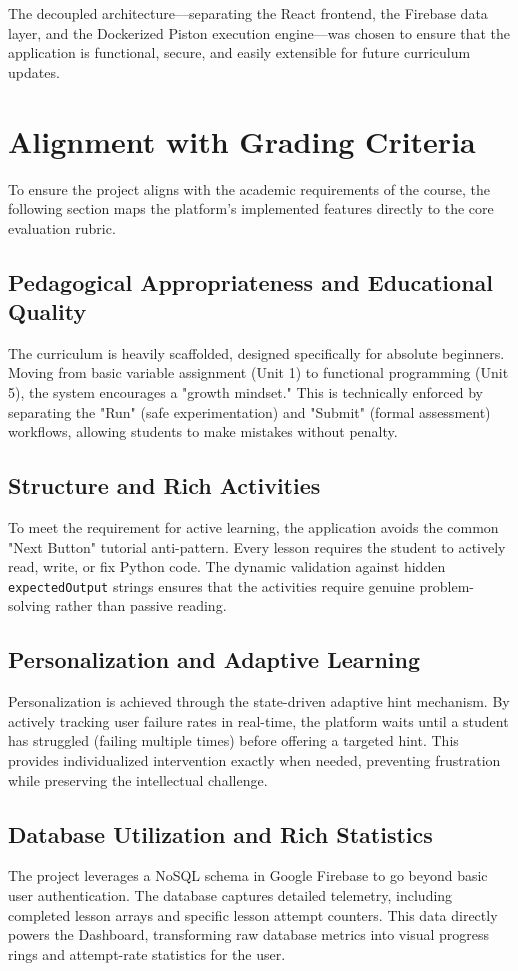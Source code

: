 \documentclass[12pt]{report}
\begin{document}
The decoupled architecture—separating the React frontend, the Firebase data layer, and the Dockerized Piston execution engine—was chosen to ensure that the application is functional, secure, and easily extensible for future curriculum updates.

\section{Alignment with Grading Criteria}
To ensure the project aligns with the academic requirements of the course, the following section maps the platform's implemented features directly to the core evaluation rubric.

\subsection{Pedagogical Appropriateness and Educational Quality}
The curriculum is heavily scaffolded, designed specifically for absolute beginners. Moving from basic variable assignment (Unit 1) to functional programming (Unit 5), the system encourages a "growth mindset." This is technically enforced by separating the "Run" (safe experimentation) and "Submit" (formal assessment) workflows, allowing students to make mistakes without penalty.

\subsection{Structure and Rich Activities}
To meet the requirement for active learning, the application avoids the common "Next Button" tutorial anti-pattern. Every lesson requires the student to actively read, write, or fix Python code. The dynamic validation against hidden \texttt{expectedOutput} strings ensures that the activities require genuine problem-solving rather than passive reading.

\subsection{Personalization and Adaptive Learning}
Personalization is achieved through the state-driven adaptive hint mechanism. By actively tracking user failure rates in real-time, the platform waits until a student has struggled (failing multiple times) before offering a targeted hint. This provides individualized intervention exactly when needed, preventing frustration while preserving the intellectual challenge.

\subsection{Database Utilization and Rich Statistics}
The project leverages a NoSQL schema in Google Firebase to go beyond basic user authentication. The database captures detailed telemetry, including completed lesson arrays and specific lesson attempt counters. This data directly powers the Dashboard, transforming raw database metrics into visual progress rings and attempt-rate statistics for the user.
\end{document}
